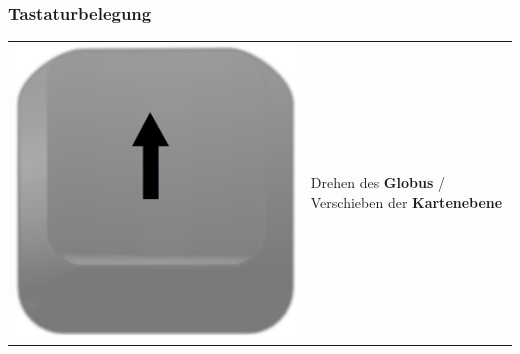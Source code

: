 \documentclass[10pt]{scrreprt}
\begin{document}
\vspace{3mm}
\subsubsection*{Tastaturbelegung}  
\begin{tabular}{|>{\centering \arraybackslash}m{3cm}|m{10cm}|}
\hline
\rule[-1ex]{0pt}{7ex}\includegraphics[scale=0.08]{images/key_arrow_up.eps}& \multirow{3}{*}{Drehen des \textbf{Globus} / Verschieben der \textbf{Kartenebene}}\\

\end{tabular}
\end{document}
